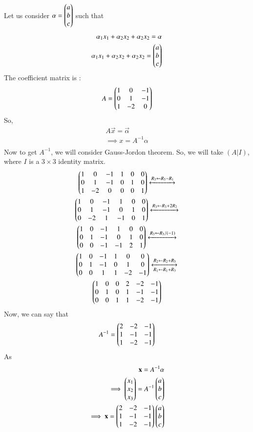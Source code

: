 Let us consider $\mathbf{\alpha} = \begin{pmatrix}a\\b\\c\end{pmatrix}$ such that
\begin{align}
\alpha_1 x_1 + \alpha_2 x_2 + \alpha_2 x_2 = \mathbf{\alpha}\\
\alpha_1 x_1 + \alpha_2 x_2 + \alpha_2 x_2 = \begin{pmatrix}a\\b\\c\end{pmatrix}
\end{align}
The coefficient matrix is :
\begin{align}
A = \begin{pmatrix}1 & 0 & -1\\0 & 1 & -1\\1 & -2 & 0\end{pmatrix}
\end{align}
So,
\begin{align}
A\vec{x}= \vec{\alpha}\\
\implies x = A^{-1} \alpha\\
\end{align}
Now to get $A^{-1}$, we will consider Gauss-Jordon theorem. So, we will take $(A|I)$, where $I$ is a $3\times3$ identity matrix.
\begin{multline}
\begin{pmatrix}1 & 0 & -1 & 1 & 0 & 0\\0 & 1 & -1 & 0 & 1 & 0\\1 & -2 & 0 & 0 & 0 & 1\end{pmatrix}\xleftrightarrow[]{R_3\leftarrow R_3-R_1}\\
\begin{pmatrix}1 & 0 & -1 & 1 & 0 & 0\\0 & 1 & -1 & 0 & 1 & 0\\0 & -2 & 1 & -1 & 0 & 1\end{pmatrix}
\xleftrightarrow[]{R_3\leftarrow R_3+2R_2}\\
\begin{pmatrix}1 & 0 & -1 & 1 & 0 & 0\\0 & 1 & -1 & 0 & 1 & 0\\0 & 0 & -1 & -1 & 2 & 1\end{pmatrix}\xleftrightarrow[]{R_3\leftarrow R_3/(-1)}\\
\begin{pmatrix}1 & 0 & -1 & 1 & 0 & 0\\0 & 1 & -1 & 0 & 1 & 0\\0 & 0 & 1 & 1 & -2 & -1\end{pmatrix}\xleftrightarrow[R_1\leftarrow R_1+R_3]{R_2\leftarrow R_2+R_3}\\
\begin{pmatrix}1 & 0 & 0 & 2 & -2 & -1\\0 & 1 & 0 & 1 & -1 & -1\\0 & 0 & 1 & 1 & -2 & -1\end{pmatrix}
\end{multline}
Now, we can say that
\begin{align}
A^{-1} = \begin{pmatrix}2 & -2 & -1\\1 & -1 & -1\\1 & -2 & -1\end{pmatrix}
\end{align}
As
\begin{align}
\mathbf{x} = A^{-1} \mathbf{\alpha}\\
\implies \begin{pmatrix}x_1\\x_2\\x_3\end{pmatrix}= A^{-1} \begin{pmatrix}a\\b\\c\end{pmatrix}\\
\implies \mathbf{x}= \begin{pmatrix}2 & -2 & -1\\1 & -1 & -1\\1 & -2 & -1\end{pmatrix} \begin{pmatrix}a\\b\\c\end{pmatrix}
\end{align}

